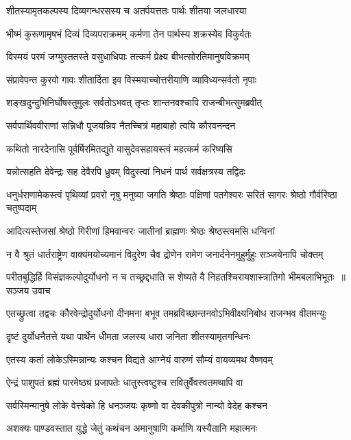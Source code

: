 \twolineshloka
{शीतस्यामृतकल्पस्य दिव्यगन्धरसस्य च}
{अतर्पयत्ततः पार्थः शीतया जलधारया}


\twolineshloka
{भीष्मं कुरूणामृषभं दिव्यं दिव्यपराक्रमम्}
{कर्मणा तेन पार्थस्य शक्रस्येव विकुर्वतः}


\twolineshloka
{विस्मयं परमं जग्मुस्ततस्ते वसुधाधिपाः}
{तत्कर्म प्रेक्ष्य बीभत्सोरतिमानुषविक्रमम्}


\twolineshloka
{संप्रावेपन्त कुरवो गावः शीतार्दिता इव}
{विस्मयाच्चोत्तरीयाणि व्याविध्यन्सर्वतो नृपाः}


\twolineshloka
{शङ्खदुन्दुभिनिर्घोषस्तुमुलः सर्वतोऽभवत्}
{तृप्तः शान्तनवश्चापि राजन्बीभत्सुमब्रवीत्}


\twolineshloka
{सर्वपार्थिववीराणां सन्निधौ पूजयन्निव}
{नैतच्चित्रं महाबाहो त्वयि कौरवनन्दन}


\twolineshloka
{कथितो नारदेनासि पूर्वर्षिरमितद्युते}
{वासुदेवसहायस्त्वं महत्कर्म करिष्यसि}


\twolineshloka
{यन्नोत्सहति देवेन्द्रः सह देवैरपि ध्रुवम्}
{विदुस्त्वां निधनं पार्थ सर्वक्षत्रस्य तद्विदः}


धनुर्धराणामेकस्त्वं पृथिव्यां प्रवरो नृषु
\twolineshloka
{मनुष्या जगति श्रेष्ठाः पक्षिणां पतगेश्वरः}
{सरितं सागरः श्रेष्ठो गौर्वरिष्ठा चतुष्पदाम्}


\twolineshloka
{आदित्यस्तेजसां श्रेष्ठो गिरीणां हिमवान्वरः}
{जातीनां ब्राह्मणः श्रेष्ठः श्रेष्ठस्त्वमसि धन्विनां}


\twolineshloka
{न वै श्रुतं धार्तराष्ट्रेण वाक्यंमयोच्यमानं विदुरेण चैव}
{द्रोणेन रामेण जनार्दनेनमुहुर्मुहुः सञ्जयेनापि चोक्तम्}


\threelineshloka
{परीतबुद्धिर्हि विसंज्ञकल्पोदुर्योधनो न च तच्छ्रद्दधाति}
{स शेष्यते वै निहतश्चिरायशास्त्रातिगो भीमबलाभिभूतः ॥सञ्जय उवाच}
{}


\twolineshloka
{एतच्छ्रुत्वा तद्वचः कौरवेन्द्रोदुर्योधनो दीनमना बभूव}
{तमब्रविच्छान्तनवोऽभिवीक्ष्यनिबोध राजन्भव वीतमन्युः}


\twolineshloka
{दृष्टं दुर्योधनैतत्ते यथा पार्थेन धीमता}
{जलस्य धारा जनिता शीतस्यामृतगन्धिनः}


\twolineshloka
{एतस्य कर्ता लोकेऽस्मिन्नान्यः कश्चन विद्यते}
{आग्नेयं वारुणं सौम्यं वायव्यमथ वैष्णवम्}


\twolineshloka
{ऐन्द्रं पाशुपतं ब्रह्मं पारमेष्ठ्यं प्रजापतेः}
{धातुस्त्वष्टुश्च सवितुर्वैवस्वतमथापि वा}


\twolineshloka
{सर्वस्मिन्मानुषे लोके वेत्त्येको हि धनञ्जयः}
{कृष्णो वा देवकीपुत्रो नान्यो वेदेह कश्चन}


\twolineshloka
{अशक्यः पाण्डवस्तात युद्धे जेतुं कथंचन}
{अमानुषाणि कर्माणि यस्यैतानि महात्मनः}


